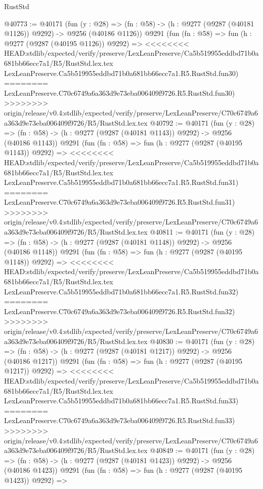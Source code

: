 \begin{lexlean}{RustStd}
\begin{coremodule}
{\begin{coremodule}
{{{{{{{{{{{{{{{{{{{{{{{{{{{{{{{{{{{{{{{{{{{{{{{{{{{{{{{@40773 := @40171
    (fun (y : @28) =>
    (fn : @58) -> (h : @9277 (@9287 (@40181 @1126)) @9292) -> @9256 (@40186 @1126))
    @9291
    (fun (fn : @58) =>
    fun (h : @9277 (@9287 (@40195 @1126)) @9292) =>
<<<<<<<< HEAD:stdlib/expected/verify/preserve/LexLeanPreserve/Ca5b519955eddbd71b0a681bb66ecc7a1/R5/RustStd.lex.tex
    LexLeanPreserve.Ca5b519955eddbd71b0a681bb66ecc7a1.R5.RustStd.fun30)
========
    LexLeanPreserve.C70c6749a6a363d9e73eba006409f9726.R5.RustStd.fun30)
>>>>>>>> origin/release/v0.4:stdlib/expected/verify/preserve/LexLeanPreserve/C70c6749a6a363d9e73eba006409f9726/R5/RustStd.lex.tex
@40792 := @40171
    (fun (y : @28) =>
    (fn : @58) -> (h : @9277 (@9287 (@40181 @1143)) @9292) -> @9256 (@40186 @1143))
    @9291
    (fun (fn : @58) =>
    fun (h : @9277 (@9287 (@40195 @1143)) @9292) =>
<<<<<<<< HEAD:stdlib/expected/verify/preserve/LexLeanPreserve/Ca5b519955eddbd71b0a681bb66ecc7a1/R5/RustStd.lex.tex
    LexLeanPreserve.Ca5b519955eddbd71b0a681bb66ecc7a1.R5.RustStd.fun31)
========
    LexLeanPreserve.C70c6749a6a363d9e73eba006409f9726.R5.RustStd.fun31)
>>>>>>>> origin/release/v0.4:stdlib/expected/verify/preserve/LexLeanPreserve/C70c6749a6a363d9e73eba006409f9726/R5/RustStd.lex.tex
@40811 := @40171
    (fun (y : @28) =>
    (fn : @58) -> (h : @9277 (@9287 (@40181 @1148)) @9292) -> @9256 (@40186 @1148))
    @9291
    (fun (fn : @58) =>
    fun (h : @9277 (@9287 (@40195 @1148)) @9292) =>
<<<<<<<< HEAD:stdlib/expected/verify/preserve/LexLeanPreserve/Ca5b519955eddbd71b0a681bb66ecc7a1/R5/RustStd.lex.tex
    LexLeanPreserve.Ca5b519955eddbd71b0a681bb66ecc7a1.R5.RustStd.fun32)
========
    LexLeanPreserve.C70c6749a6a363d9e73eba006409f9726.R5.RustStd.fun32)
>>>>>>>> origin/release/v0.4:stdlib/expected/verify/preserve/LexLeanPreserve/C70c6749a6a363d9e73eba006409f9726/R5/RustStd.lex.tex
@40830 := @40171
    (fun (y : @28) =>
    (fn : @58) -> (h : @9277 (@9287 (@40181 @1217)) @9292) -> @9256 (@40186 @1217))
    @9291
    (fun (fn : @58) =>
    fun (h : @9277 (@9287 (@40195 @1217)) @9292) =>
<<<<<<<< HEAD:stdlib/expected/verify/preserve/LexLeanPreserve/Ca5b519955eddbd71b0a681bb66ecc7a1/R5/RustStd.lex.tex
    LexLeanPreserve.Ca5b519955eddbd71b0a681bb66ecc7a1.R5.RustStd.fun33)
========
    LexLeanPreserve.C70c6749a6a363d9e73eba006409f9726.R5.RustStd.fun33)
>>>>>>>> origin/release/v0.4:stdlib/expected/verify/preserve/LexLeanPreserve/C70c6749a6a363d9e73eba006409f9726/R5/RustStd.lex.tex
@40849 := @40171
    (fun (y : @28) =>
    (fn : @58) -> (h : @9277 (@9287 (@40181 @1423)) @9292) -> @9256 (@40186 @1423))
    @9291
    (fun (fn : @58) =>
    fun (h : @9277 (@9287 (@40195 @1423)) @9292) =>
}}}}}}}}}}}}}}}}}}}}}}}}}}}}}}}}}}}}}}}}}}}}}}}}}}}}}}}
\end{coremodule}}
\end{coremodule}
\end{lexlean}

